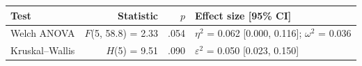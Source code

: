 \begin{tabular}{lrrp{6.4cm}}
  \toprule
Test & Statistic & $p$ & Effect size [95\% CI] \\ 
  \midrule
Welch ANOVA & $F$(5, 58.8) = 2.33 & .054 & $\eta^2$ = 0.062 [0.000, 0.116]; $\omega^2$ = 0.036 \\ 
  Kruskal--Wallis & $H$(5) = 9.51 & .090 & $\varepsilon^2$ = 0.050 [0.023, 0.150] \\ 
   \bottomrule
\end{tabular}
